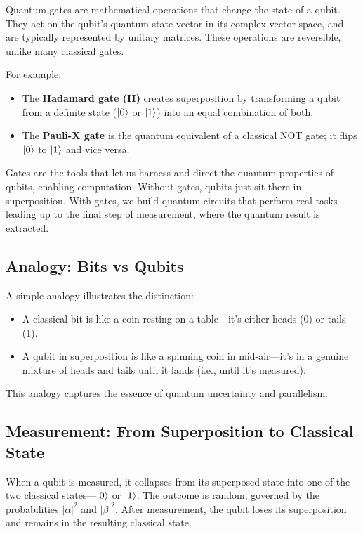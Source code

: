 \documentclass{article}
\begin{document}
Quantum gates are mathematical operations that change the state of a qubit. They act on the qubit's quantum state vector in its complex vector space, and are typically represented by unitary matrices. These operations are reversible, unlike many classical gates.

For example:
\begin{itemize}
    \item The \textbf{Hadamard gate (H)} creates superposition by transforming a qubit from a definite state ($\ket{0}$ or $\ket{1}$) into an equal combination of both.
    \item The \textbf{Pauli-X gate} is the quantum equivalent of a classical NOT gate; it flips $\ket{0}$ to $\ket{1}$ and vice versa.
\end{itemize}

Gates are the tools that let us harness and direct the quantum properties of qubits, enabling computation. Without gates, qubits just sit there in superposition. With gates, we build quantum circuits that perform real tasks—leading up to the final step of measurement, where the quantum result is extracted.

\subsection{Analogy: Bits vs Qubits}
A simple analogy illustrates the distinction:

\begin{itemize}
    \item A classical bit is like a coin resting on a table---it's either heads (0) or tails (1).
    \item A qubit in superposition is like a spinning coin in mid-air---it's in a genuine mixture of heads and tails until it lands (i.e., until it's measured).
\end{itemize}

This analogy captures the essence of quantum uncertainty and parallelism.

\subsection{Measurement: From Superposition to Classical State}
When a qubit is measured, it collapses from its superposed state into one of the two classical states---$\ket{0}$ or $\ket{1}$. The outcome is random, governed by the probabilities $|\alpha|^2$ and $|\beta|^2$. After measurement, the qubit loses its superposition and remains in the resulting classical state.
\end{document}
